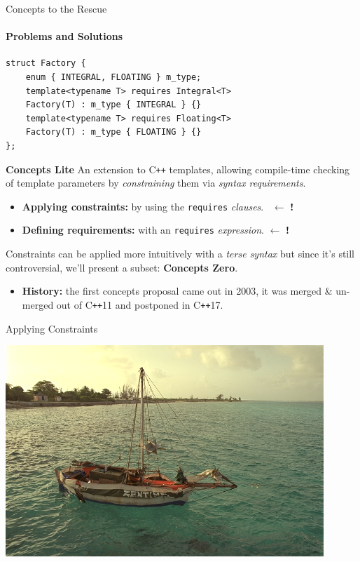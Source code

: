 \documentclass{beamer}
\begin{document}
    \begin{frame}[fragile]{Concepts to the Rescue}
        \framesubtitle{Problems and Solutions}
        \begin{center}
        \begin{lstlisting}[caption={overloading based on constraint with the \texttt{requires} clause.}]
struct Factory {
    enum { INTEGRAL, FLOATING } m_type;
    template<typename T> requires Integral<T>
    Factory(T) : m_type { INTEGRAL } {}
    template<typename T> requires Floating<T>
    Factory(T) : m_type { FLOATING } {}
}; \end{lstlisting}
        \end{center}
    \end{frame}

    \begin{frame}[fragile]{\textbf{Concepts Lite}}
        An extension to C\texttt{++} templates, allowing compile-time checking of template parameters by \emph{constraining} them via \emph{syntax requirements}.

        \begin{itemize}
            \item{\textbf{Applying constraints:} by using the \texttt{requires} \emph{clauses}. \ $\leftarrow$ \textbf{!}}
            \item{\textbf{Defining requirements:} with an \texttt{requires} \emph{expression}. $\leftarrow$ \textbf{!}}
        \end{itemize}

        Constraints can be applied more intuitively with a \emph{terse syntax} but since it's still controversial, we'll present a subset: \textbf{Concepts Zero}.

        \begin{itemize}
            \item{\textbf{History:} the first concepts proposal came out in 2003, it was merged \& un-merged out of C\texttt{++}11 and postponed in C\texttt{++}17}.
        \end{itemize}
    \end{frame}

    \begin{frame}[fragile]{Applying Constraints}
        \begin{center}
        \includegraphics[width=0.9\textwidth]{figures/applying.png}
        \end{center}
    \end{frame}
\end{document}
